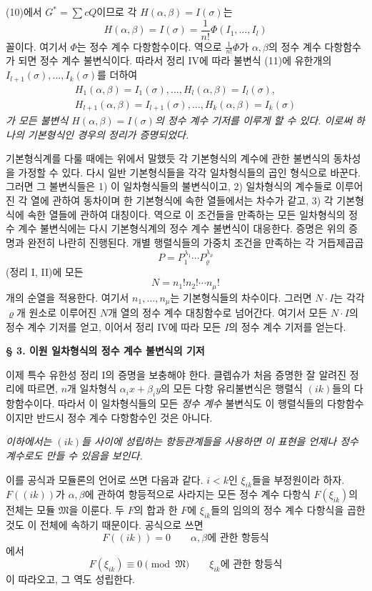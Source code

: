 (10)에서 \(G^*=\sum cQ\)이므로 각 \(H(\alpha,\beta)=I(\sigma)\)는
\[
H(\alpha,\beta)=I(\sigma)=\frac1{n!}\Phi(I_1,\ldots,I_l)
\]
꼴이다. 여기서 \(\Phi\)는 정수 계수 다항함수이다. 역으로 \(\frac1{n!}\Phi\)가 \(\alpha,\beta\)의 정수 계수 다항함수가 되면 정수 계수 불변식이다. 따라서 정리 IV에 따라 불변식 (11)에 유한개의 \(I_{l+1}(\sigma),\ldots,I_k(\sigma)\)를 더하여
\[
\begin{gathered}
H_1(\alpha,\beta)=I_1(\sigma),\ldots,H_l(\alpha,\beta)=I_l(\sigma),\\
H_{l+1}(\alpha,\beta)=I_{l+1}(\sigma),\ldots,H_k(\alpha,\beta)=I_k(\sigma)
\end{gathered}
\]
\emph{가 모든 불변식 \(H(\alpha,\beta)=I(\sigma)\)의 정수 계수 기저를 이루게 할 수 있다. 이로써 하나의 기본형식인 경우의 정리가 증명되었다.}

기본형식계를 다룰 때에는 위에서 말했듯 각 기본형식의 계수에 관한 불변식의 동차성을 가정할 수 있다. 다시 일반 기본형식들을 각각 일차형식들의 곱인 형식으로 바꾼다. 그러면 그 불변식들은 1) 이 일차형식들의 불변식이고, 2) 일차형식의 계수들로 이루어진 각 열에 관하여 동차이며 한 기본형식에 속한 열들에서는 차수가 같고, 3) 각 기본형식에 속한 열들에 관하여 대칭이다. 역으로 이 조건들을 만족하는 모든 일차형식의 정수 계수 불변식에는 다시 기본형식계의 정수 계수 불변식이 대응한다. 증명은 위의 증명과 완전히 나란히 진행된다. 개별 행렬식들의 가중치 조건을 만족하는 각 거듭제곱곱
\[
P=P_1^{\lambda_1}\cdots P_\varrho^{\lambda_\varrho}
\]
(정리 I, II)에 모든
\[
N=n_1!n_2!\cdots n_\mu!
\]
개의 순열을 적용한다. 여기서 \(n_1,\ldots,n_\mu\)는 기본형식들의 차수이다. 그러면 \(N\cdot I\)는 각각 \(\varrho\)개 원소로 이루어진 \(N\)개 열의 정수 계수 대칭함수로 넘어간다. 여기서 모든 \(N\cdot I\)의 정수 계수 기저를 얻고, 이어서 정리 IV에 따라 모든 \(I\)의 정수 계수 기저를 얻는다.

\bigskip
\begin{center}
\textbf{§ 3. 이원 일차형식의 정수 계수 불변식의 기저}
\end{center}

이제 특수 유한성 정리 I의 증명을 보충해야 한다. 클렙슈가 처음 증명한 잘 알려진 정리에 따르면, \(n\)개 일차형식 \(\alpha_i x+\beta_i y\)의 모든 다항 유리불변식은 행렬식 \((ik)\)들의 다항함수이다. 따라서 이 일차형식들의 모든 \emph{정수 계수} 불변식도 이 행렬식들의 다항함수이지만 반드시 정수 계수 다항함수인 것은 아니다.

\emph{이하에서는 \((ik)\)들 사이에 성립하는 항등관계들을 사용하면 이 표현을 언제나 정수 계수로도 만들 수 있음을 보인다.}

이를 공식과 모듈론의 언어로 쓰면 다음과 같다. \(i<k\)인 \(\xi_{ik}\)들을 부정원이라 하자. \(F((ik))\)가 \(\alpha,\beta\)에 관하여 항등적으로 사라지는 모든 정수 계수 다항식 \(F(\xi_{ik})\)의 전체는 모듈 \(\mathfrak M\)을 이룬다. 두 \(F\)의 합과 한 \(F\)에 \(\xi_{ik}\)들의 임의의 정수 계수 다항식을 곱한 것도 이 전체에 속하기 때문이다. 공식으로 쓰면
\[
F((ik))=0\qquad\text{\(\alpha,\beta\)에 관한 항등식}
\]
에서
\[
F(\xi_{ik})\equiv0\pmod{\mathfrak M}
\qquad\text{\(\xi_{ik}\)에 관한 항등식}
\]
이 따라오고, 그 역도 성립한다.

